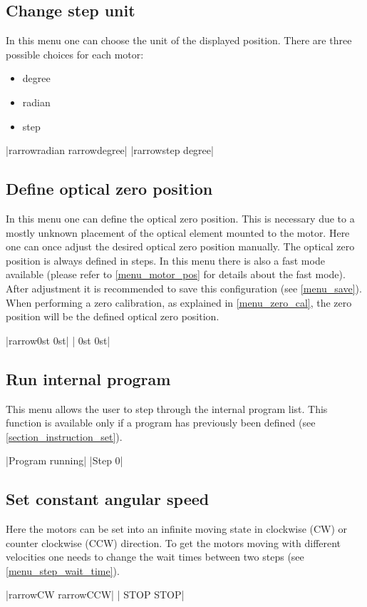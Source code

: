 \subsection{Change step unit}
\label{chp:change_step_unit}
In this menu one can choose the unit of the displayed position. There
are three possible choices for each motor:
\begin{itemize}
\item degree
\item radian
\item step
\end{itemize}
\begin{center}
  |{rarrow}radian {rarrow}degree|
             |{rarrow}step    degree|
\end{center}


\subsection{Define optical zero position}
In this menu one can define the optical zero position. This is
necessary due to a mostly unknown placement of the optical element
mounted to the motor. Here one can once adjust the desired optical
zero position manually. The optical zero position is always
defined in steps. In this menu there is also a fast mode available
(please refer to \ref{menu_motor_pos} for details about the fast mode).
After adjustment it is recommended to save this configuration
(see \ref{menu_save}).
When performing a zero calibration, as explained in \ref{menu_zero_cal},
the zero position will be the defined optical zero position.
\begin{center}
  |{rarrow}0st     0st|
             | 0st     0st|
\end{center}


\subsection{Run internal program}
This menu allows the user to step through the internal program list.
This function is available only if a program has previously been
defined (see \ref{section_instruction_set}).
\begin{center}
  |Program running|
             |Step 0|
\end{center}


\subsection{Set constant angular speed}
Here the motors can be set into an infinite moving state in clockwise
(CW) or counter clockwise (CCW) direction. To get the motors moving
with different velocities one needs to change the wait times between
two steps (see \ref{menu_step_wait_time}).
\begin{center}
  |{rarrow}CW     {rarrow}CCW|
             | STOP    STOP|
\end{center}



